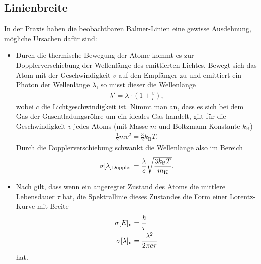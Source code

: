 \subsection{Linienbreite}
In der Praxis haben die beobachtbaren Balmer-Linien eine gewisse Ausdehnung, mögliche Ursachen dafür sind:
\begin{itemize}
\item    
Durch die thermische Bewegung der Atome kommt es zur Dopplerverschiebung der Wellenlänge des emittierten Lichtes. Bewegt sich das Atom mit der Geschwindigkeit $v$ auf den Empfänger zu und emittiert ein Photon der Wellenlänge $\lambda$, so misst dieser die Wellenlänge 
\begin{align*}
  \lambda'=\lambda \cdot \left(  1+ \frac{v}{c} \right),
\end{align*} 
wobei $c$ die Lichtgeschwindigkeit ist. Nimmt man an, dass es sich bei dem Gas der Gasentladungsröhre um ein ideales Gas handelt, gilt für die Geschwindigkeit $v$ jedes Atoms (mit Masse $m$ und Boltzmann-Konstante $k_\mathrm{B}$)
\begin{align*}
  \frac{1}{2} m v^2=\frac{3}{2} k_\mathrm{B} T.
\end{align*}
Durch die Dopplerverschiebung schwankt die Wellenlänge also im Bereich
\begin{align}
  \sigma[\lambda]_\mathrm{Doppler}=\frac{\lambda}{c}\sqrt{\frac{3k_\mathrm{B}T}{m_\mathrm{K}}}.
  \label{equ:doppler}
\end{align}
\item
Nach \cite{unschaerfe} gilt, dass wenn ein angeregter Zustand des Atoms die mittlere Lebensdauer $\tau$ hat, die Spektrallinie dieses Zustandes die Form einer Lorentz-Kurve mit Breite 
\begin{align}
  \sigma[E]_\mathrm{n}&=\frac{\hbar}{\tau}\\
  \sigma[\lambda]_\mathrm{n} &= \frac{\lambda^2}{2\pi c \tau}
  \label{equ:natbreite}
\end{align}
hat.
\end{itemize}